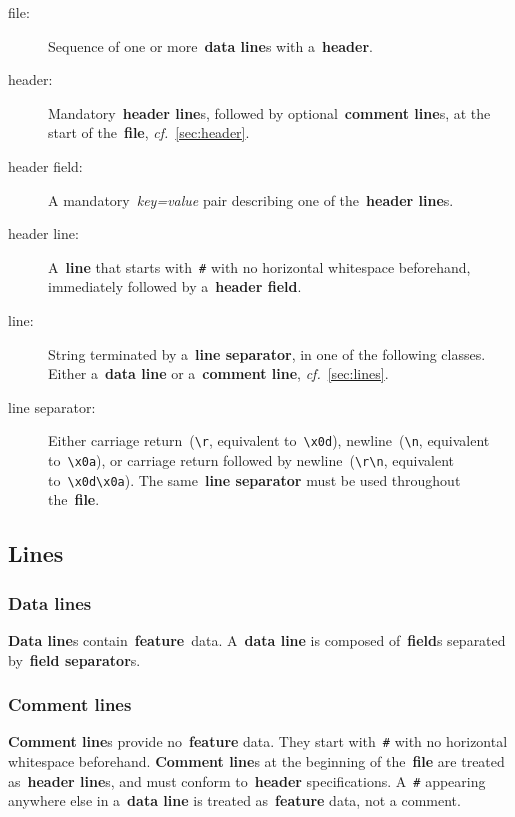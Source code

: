 \documentclass[11pt]{article}
\begin{document}
\begin{description}
\item[file:]
  Sequence of one or more~\textbf{data line}s with a~\textbf{header}.

\item[header:]
  Mandatory~\textbf{header line}s, followed by optional~\textbf{comment line}s, at the start of the~\textbf{file}, \textit{cf.}~\autoref{sec:header}.

\item[header field:]
  A mandatory~\emph{key=value} pair describing one of the~\textbf{header line}s. 
  
\item[header line:]
  A~\textbf{line} that starts with~\texttt{\#} with no horizontal whitespace beforehand, immediately followed by a~\textbf{header field}.
  
\item[line:]
  String terminated by a~\textbf{line separator}, in one of the following classes.
  Either a~\textbf{data line} or a~\textbf{comment line}, \textit{cf.}~\autoref{sec:lines}.

\item[line separator:]
  Either carriage return~(\texttt{{\textbackslash}r}, equivalent to~\texttt{{\textbackslash}x0d}), newline~(\texttt{{\textbackslash}n}, equivalent to~\texttt{{\textbackslash}x0a}), or carriage return followed by newline~(\texttt{{\textbackslash}r{\textbackslash}n}, equivalent to~\texttt{{\textbackslash}x0d{\textbackslash}x0a}).
  The same~\textbf{line separator} must be used throughout the~\textbf{file}.
\end{description}

\subsection{Lines}\label{sec:lines}

\subsubsection{Data lines}

\textbf{Data line}s contain~\textbf{feature}~data.
A~\textbf{data line} is composed of~\textbf{field}s separated by~\textbf{field separator}s.

\subsubsection{Comment lines}

\textbf{Comment line}s provide no~\textbf{feature} data. They start with~\texttt{\#} with no horizontal whitespace beforehand.
\textbf{Comment line}s at the beginning of the~\textbf{file} are treated as~\textbf{header line}s, and must conform to~\textbf{header} specifications. A~\texttt{\#} appearing anywhere else in a~\textbf{data line} is treated as~\textbf{feature} data, not a comment.
\end{document}
